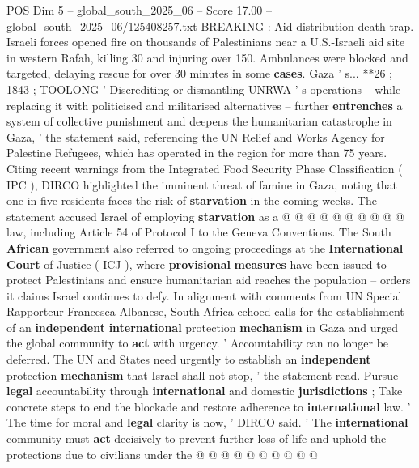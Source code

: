 \begin{textsample}{POS Dim 5 – global\_south\_2025\_06 – Score 17.00 – global\_south\_2025\_06/125408257.txt}
BREAKING : Aid distribution death trap.
Israeli forces opened fire on thousands of Palestinians near a U.S.-Israeli aid site in western Rafah, killing 30 and injuring over 150.
Ambulances were blocked and targeted, delaying rescue for over 30 minutes in some \textbf{cases}.
Gaza ' s... **26 ; 1843 ; TOOLONG ' Discrediting or dismantling UNRWA ' s operations -- while replacing it with politicised and militarised alternatives -- further \textbf{entrenches} a system of collective punishment and deepens the humanitarian catastrophe in Gaza, ' the statement said, referencing the UN Relief and Works Agency for Palestine Refugees, which has operated in the region for more than 75 years.
Citing recent warnings from the Integrated Food Security Phase Classification ( IPC ), DIRCO highlighted the imminent threat of famine in Gaza, noting that one in five residents faces the risk of \textbf{starvation} in the coming weeks.
The statement accused Israel of employing \textbf{starvation} as a @ @ @ @ @ @ @ @ @ @ law, including Article 54 of Protocol I to the Geneva Conventions.
The South \textbf{African} government also referred to ongoing proceedings at the \textbf{International} \textbf{Court} of Justice ( ICJ ), where \textbf{provisional} \textbf{measures} have been issued to protect Palestinians and ensure humanitarian aid reaches the population -- orders it claims Israel continues to defy.
In alignment with comments from UN Special Rapporteur Francesca Albanese, South Africa echoed calls for the establishment of an \textbf{independent} \textbf{international} protection \textbf{mechanism} in Gaza and urged the global community to \textbf{act} with urgency. ' Accountability can no longer be deferred.
The UN and States need urgently to establish an \textbf{independent} protection \textbf{mechanism} that Israel shall not stop, ' the statement read.
Pursue \textbf{legal} accountability through \textbf{international} and domestic \textbf{jurisdictions} ; Take concrete steps to end the blockade and restore adherence to \textbf{international} law. ' The time for moral and \textbf{legal} clarity is now, ' DIRCO said. ' The \textbf{international} community must \textbf{act} decisively to prevent further loss of life and uphold the protections due to civilians under the @ @ @ @ @ @ @ @ @ @

\end{textsample}
